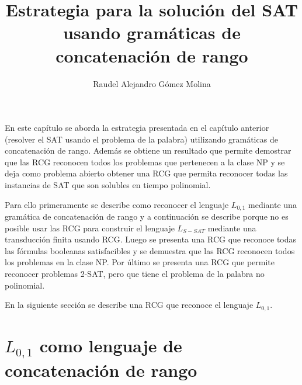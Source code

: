 \documentclass[12pt]{article}
\title{Estrategia para la solución del SAT usando gramáticas de concatenación de rango}
\author{Raudel Alejandro Gómez Molina}
\begin{document}
\maketitle






En este capítulo se aborda la estrategia presentada en el capítulo anterior (resolver el SAT usando el problema
de la palabra) utilizando gramáticas de concatenación de rango. Además se obtiene un resultado que permite
demostrar que las RCG reconocen todos los problemas que pertenecen a la clase NP y se deja como problema
abierto obtener una RCG que permita reconocer todas las instancias de SAT que son solubles en tiempo polinomial.

Para ello primeramente se describe como reconocer el lenguaje $L_{0,1}$ mediante una gramática de concatenación
de rango y a continuación se describe porque no es posible usar las RCG para construir el lenguaje $L_{S-SAT}$
mediante una transducción finita usando RCG. Luego se presenta una RCG que reconoce todas las fórmulas booleanas
satisfacibles y se demuestra que las RCG reconocen todos los problemas en la clase NP. Por último se presenta una
RCG que permite reconocer problemas 2-SAT, pero que tiene el problema de la palabra no polinomial.

En la siguiente sección se describe una RCG que reconoce el lenguaje $L_{0,1}$.

\section{$L_{0,1}$ como lenguaje de concatenación de rango}
\end{document}
